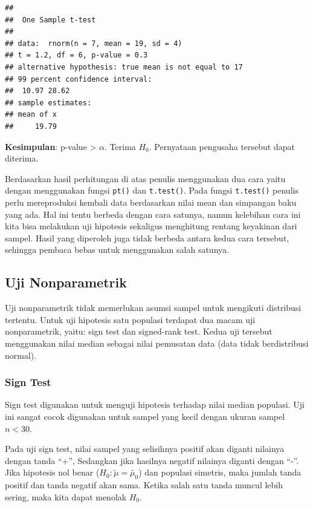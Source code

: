 \documentclass[]{book}
\begin{document}
\begin{verbatim}
## 
##  One Sample t-test
## 
## data:  rnorm(n = 7, mean = 19, sd = 4)
## t = 1.2, df = 6, p-value = 0.3
## alternative hypothesis: true mean is not equal to 17
## 99 percent confidence interval:
##  10.97 28.62
## sample estimates:
## mean of x 
##     19.79
\end{verbatim}

\textbf{Kesimpulan}: p-value \textgreater{} \(\alpha\). Terima \(H_0\).
Pernyataan pengusaha tersebut dapat diterima.

Berdasarkan hasil perhitungan di atas penulis menggunakan dua cara yaitu
dengan menggunakan fungsi \texttt{pt()} dan \texttt{t.test()}. Pada
fungsi \texttt{t.test()} penulis perlu mereproduksi kembali data
berdasarkan nilai mean dan simpangan baku yang ada. Hal ini tentu
berbeda dengan cara satunya, namun kelebihan cara ini kita bisa
melakukan uji hipotesis sekaligus menghitung rentang keyakinan dari
sampel. Hasil yang diperoleh juga tidak berbeda antara kedua cara
tersebut, sehingga pembaca bebas untuk menggunakan salah satunya.

\subsection{Uji Nonparametrik}\label{uji-nonparametrik}

Uji nonparametrik tidak memerlukan asumsi sampel untuk mengikuti
distribusi tertentu. Untuk uji hipotesis satu populasi terdapat dua
macam uji nonparametrik, yaitu: sign test dan signed-rank test. Kedua
uji tersebut menggunakan nilai median sebagai nilai pemusatan data (data
tidak berdistribusi normal).

\subsubsection{Sign Test}\label{sign-test}

Sign test digunakan untuk menguji hipotesis terhadap nilai median
populasi. Uji ini sangat cocok digunakan untuk sampel yang kecil dengan
ukuran sampel \(n<30\).

Pada uji sign test, nilai sampel yang selisihnya positif akan diganti
nilainya dengan tanda ``+'', Sedangkan jika hasilnya negatif nilainya
diganti dengan ``-''. Jika hipotesis nol benar
(\(H_0:\tilde{\mu}=\tilde{\mu_0}\)) dan populasi simetris, maka jumlah
tanda positif dan tanda negatif akan sama. Ketika salah satu tanda
muncul lebih sering, maka kita dapat menolak \(H_0\).
\end{document}

